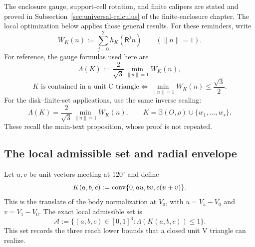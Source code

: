 The enclosure gauge, support-cell rotation, and finite calipers are
stated and proved in Subsection~\ref{sec:universal-calculus} of the
finite-enclosure chapter. The local optimization below applies those
general results. For these reminders, write
\[
 W_K(n):=\sum_{j=0}^{2}h_K(\mathsf R^j n)\qquad(\|n\|=1).
\]
For reference, the gauge formulas used here are
\[
 \Lambda(K):=\frac{2}{\sqrt3}\min_{\|n\|=1}W_K(n),
\]
\[
 K\text{ is contained in a unit C triangle}
 \iff
 \min_{\|n\|=1}W_K(n)\le\frac{\sqrt3}{2}.
\]
For the disk--finite-set applications, use the same inverse scaling:
\[
 \Lambda(K)=\frac{2}{\sqrt3}\min_{\|n\|=1}W_K(n),
 \qquad K=\mathbb B(O,\rho)\cup\{w_1,\ldots,w_s\}.
\]
These recall the main-text proposition, whose proof is not repeated.

\subsection{The local admissible set and radial envelope}
\label{sec:admissible-set-derivation}

Let $u,v$ be unit vectors meeting at $120^\circ$ and define
\[
 K(a,b,c):=\mathrm{conv}\{0,au,bv,c(u+v)\}.
\]
This is the translate of the body normalization at $V_0$, with
$u=V_5-V_0$ and $v=V_1-V_0$.
The exact local admissible set is
\begin{equation}
 \mathcal A:=
 \{(a,b,c)\in[0,1]^3:\Lambda(K(a,b,c))\le1\}.
 \label{eq:universal-admissible-gauge}
\end{equation}
This set records the three reach lower bounds that a closed unit V triangle
can realize.

